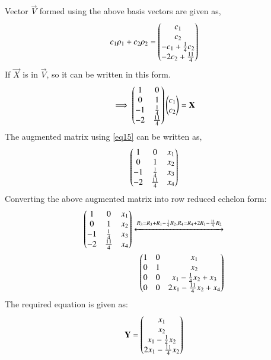 \documentclass[journal,12pt,twocolumn]{IEEEtran}
\begin{document}
Vector $\vec{V}$ formed using the above basis vectors are given as,
\begin{align}
c_1\rho_1+c_2\rho_2=\begin{pmatrix}c_1\\c_2\\-c_1+\frac{1}{4}c_2\\-2c_2+\frac{11}{4}\end{pmatrix}
\end{align}
If $\vec{X}$ is in $\vec{V}$, so it can be written in this form.\\
\begin{align}
\implies \begin{pmatrix}1&0\\0&1\\-1&\frac{1}{4}\\-2&\frac{11}{4}\end{pmatrix}\begin{pmatrix}c_1\\c_2\end{pmatrix}=\mathbf{X} \label{eq15} 
\end{align}
The augmented matrix using \ref{eq15} can be written as,
\begin{align}
\begin{pmatrix}1&0&x_1\\0&1&x_2\\-1&\frac{1}{4}&x_3\\-2&\frac{11}{4}&x_4\end{pmatrix}
\end{align}
Converting the above augmented matrix into row reduced echelon form:
\begin{align}
\begin{pmatrix}1&0&x_1\\0&1&x_2\\-1&\frac{1}{4}&x_3\\-2&\frac{11}{4}&x_4\end{pmatrix}\xleftrightarrow{R_3=R_3+R_1-\frac{1}{4}R_2, R_4=R_4+2R_1-\frac{11}{4}R_2} \nonumber\\
\begin{pmatrix}1&0&x_1\\0&1&x_2\\0&0&x_1-\frac{1}{4}x_2+x_3\\0&0&2x_1-\frac{11}{4}x_2+x_4\end{pmatrix}
\end{align}
The required equation is given as:
\begin{align}
\mathbf{Y}=\begin{pmatrix}x_1\\x_2\\x_1-\frac{1}{4}x_2\\2x_1-\frac{11}{4}x_2\end{pmatrix}
\end{align}
\end{document}
